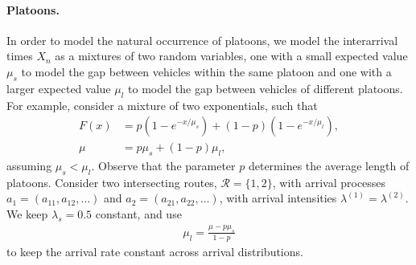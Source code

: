 \documentclass[a4paper]{report}
\theoremstyle{definition}
\theoremstyle{plain}
\begin{document}
%

\paragraph{Platoons.}
In order to model the natural occurrence of platoons, we model the interarrival
times $X_{n}$ as a mixtures of two random variables, one with a small expected
value $\mu_{s}$ to model the gap between vehicles within the same platoon and one
with a larger expected value $\mu_{l}$ to model the gap between vehicles of
different platoons. For example, consider a mixture of two exponentials, such
that
\begin{align*}
  F(x) &= p ( 1 - e^{-x / \mu_{s}} ) + (1 - p) (1 - e^{-x / \mu_{l}}) , \\[0.2em]
  \mu &= p \mu_{s} + (1-p) \mu_{l} ,
\end{align*}
%
assuming $\mu_{s} < \mu_{l}$. Observe that the parameter $p$ determines
the average length of platoons.
%
Consider two intersecting routes, $\mathcal{R} = \{1, 2\}$, with arrival processes
$a_{1} = (a_{11}, a_{12}, \dots)$ and $a_{2} = (a_{21}, a_{22}, \dots)$, with
arrival intensities $\lambda^{(1)} = \lambda^{(2)}$.
%
We keep $\lambda_{s} = 0.5$ constant, and use
\begin{align*}
  \mu_{l}  = \frac{\mu - p \mu_{s}}{1 - p}
\end{align*}
to keep the arrival rate constant across arrival distributions.
\end{document}
